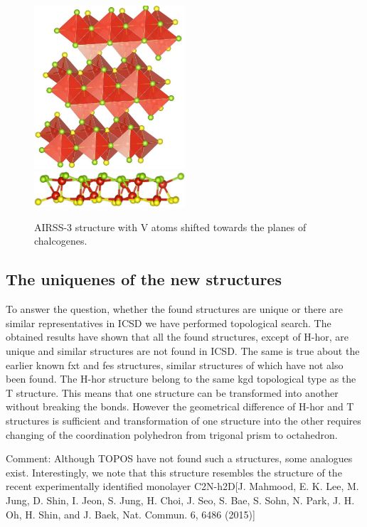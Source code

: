 \documentclass[a4paperm]{article}
\begin{document}
\begin{figure}[H]
        \includegraphics[width=0.5\textwidth]{airss-3-1.jpg} \\ \vspace{3mm}
        \includegraphics[width=0.5\textwidth]{airss-3-2.jpg}
        \caption{AIRSS-3 structure with V atoms shifted towards the planes of chalcogenes.}
\label{airss-3}
\end{figure}


\subsection{The uniquenes of the new structures}

To answer the question, whether the found structures are unique or there are similar representatives in ICSD we have performed topological search.
The obtained results have shown that all the found structures, except of H-hor, are unique and similar structures are not found in ICSD.
The same is true about the earlier known fxt and fes structures, similar structures of which have not also been found. 
The H-hor structure belong to the same kgd topological type as the T structure.
This means that one structure can be transformed into another without breaking the bonds.
However the geometrical difference of H-hor and T structures is sufficient and transformation of one structure into the other requires changing of the coordination polyhedron from trigonal prism to octahedron.

Comment:
Although TOPOS have not found such a structures, some analogues exist.
Interestingly, we note that this structure resembles the structure of the recent experimentally identified monolayer C2N-h2D[J. Mahmood, E. K. Lee, M. Jung, D. Shin, I. Jeon, S. Jung, H. Choi, J. Seo, S. Bae, S. Sohn, N. Park, J. H. Oh, H. Shin, and J.
Baek, Nat. Commun. 6, 6486 (2015)]
\end{document}

